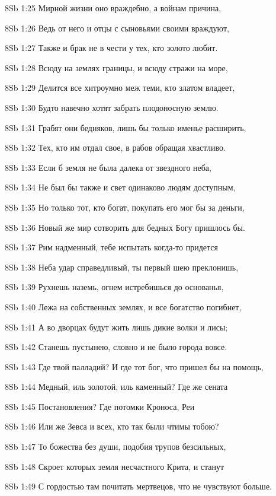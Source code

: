 \vs 8Sb 1:25 Мирной жизни оно враждебно, а войнам  причина, 

\vs 8Sb 1:26 Ведь от него и отцы с сыновьями своими враждуют, 

\vs 8Sb 1:27 Также и брак не в чести у тех, кто золото любит.

\vs 8Sb 1:28 Всюду на землях  границы, и всюду стражи на море, 

\vs 8Sb 1:29 Делится все хитроумно меж теми, кто златом владеет,

\vs 8Sb 1:30 Будто навечно хотят забрать плодоносную землю. 

\vs 8Sb 1:31 Грабят они бедняков, лишь бы только именье расширить, 

\vs 8Sb 1:32 Тех, кто им отдал свое, в рабов обращая хвастливо. 

\vs 8Sb 1:33 Если б земля не была далека от звездного неба, 

\vs 8Sb 1:34 Не был бы также и свет одинаково людям доступным,

\vs 8Sb 1:35 Но только тот, кто богат, покупать его мог бы за деньги, 

\vs 8Sb 1:36 Новый же мир сотворить для бедных Богу пришлось бы. 

\vs 8Sb 1:37 Рим надменный, тебе испытать когда-то придется 

\vs 8Sb 1:38 Неба удар справедливый, ты первый шею преклонишь, 

\vs 8Sb 1:39 Рухнешь наземь, огнем истребишься до основанья,

\vs 8Sb 1:40 Лежа на собственных землях, и все богатство погибнет, 

\vs 8Sb 1:41 А во дворцах будут жить лишь дикие волки и лисы; 

\vs 8Sb 1:42 Станешь пустынею, словно и не было города вовсе. 

\vs 8Sb 1:43 Где твой палладий? И где тот бог, что пришел бы на помощь, 

\vs 8Sb 1:44 Медный, иль золотой, иль каменный? Где же сената

\vs 8Sb 1:45 Постановления? Где потомки Кроноса, Реи

\vs 8Sb 1:46 Или же Зевса и всех, кто так были чтимы тобою? 

\vs 8Sb 1:47 То  божества без души, подобия трупов безсильных, 

\vs 8Sb 1:48 Скроет которых земля несчастного Крита, и станут 

\vs 8Sb 1:49 С гордостью там почитать мертвецов, что не чувствуют больше.

